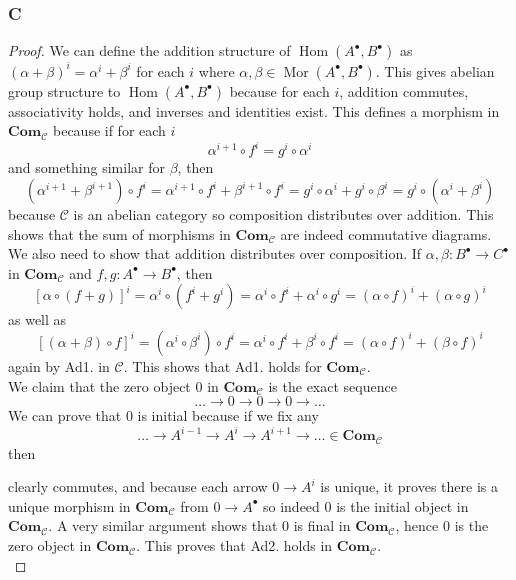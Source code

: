 \documentclass{article}
\newcommand{\fC}{\mathscr{C}}
\DeclareMathOperator{\Hom}{Hom}
\DeclareMathOperator{\Mor}{Mor}
\newcommand{\Com}{\mathbf{Com}} %
\begin{document}
\subsubsection{C}\label{1.6.C}
\begin{proof}
    We can define the addition structure of $\Hom(A^\bullet, B^\bullet)$ as $(\alpha+\beta)^i=\alpha^i+\beta^i$ for each $i$ where $\alpha,\beta\in \Mor(A^\bullet,B^\bullet)$. This gives abelian group structure to $\Hom(A^\bullet,B^\bullet)$ because for each $i$, addition commutes, associativity holds, and inverses and identities exist. This defines a morphism in $\Com_\fC$ because if for each $i$
    \[
    \alpha^{i+1}\circ f^i=g^i\circ \alpha^i
    \]
    and something similar for $\beta$, then
    \[
    (\alpha^{i+1}+\beta^{i+1})\circ f^i=\alpha^{i+1}\circ f^i+\beta^{i+1}\circ f^i=g^i\circ \alpha^i+g^i\circ \beta^i=g^i\circ (\alpha^i +\beta^i)
    \]
    because $\fC$ is an abelian category so composition distributes over addition. This shows that the sum of morphisms in $\Com_\fC$ are indeed commutative diagrams. We also need to show that addition distributes over composition. If $\alpha,\beta :B^\bullet \to C^\bullet$ in $\Com_\fC$ and $f,g:A^\bullet \to B^\bullet$, then
    \[
    [\alpha \circ(f+g)]^i=\alpha^i\circ(f^i+g^i)=\alpha^i\circ f^i+\alpha^i\circ g^i=(\alpha \circ f)^i+(\alpha \circ g)^i
    \]
    as well as
    \[
    [(\alpha+\beta)\circ f]^i=(\alpha^i\circ \beta^i)\circ f^i=\alpha^i\circ f^i+\beta^i\circ f^i=(\alpha \circ f)^i+(\beta\circ f)^i
    \]
    again by Ad1. in $\fC$.
    This shows that Ad1. holds for $\Com_\fC$.\\
    We claim that the zero object $0$ in $\Com_\fC$ is the exact sequence
    \[
    \dots \rightarrow0\rightarrow0\rightarrow0\rightarrow\dots
    \]
    We can prove that $0$ is initial because if we fix any
    \[
    \dots \rightarrow A^{i-1} \rightarrow A^i \rightarrow A^{i+1}\rightarrow \dots \in \Com_\fC
    \]
    then 
    \begin{center}
    \end{center}
    clearly commutes, and because each arrow $0\to A^i$ is unique, it proves there is a unique morphism in $\Com_\fC$ from $0\to A^\bullet$ so indeed $0$ is the initial object in $\Com_\fC$. A very similar argument shows that $0$ is final in $\Com_\fC$, hence $0$ is the zero object in $\Com_\fC$. This proves that Ad2. holds in $\Com_\fC$.\\

\end{proof}
\end{document}
